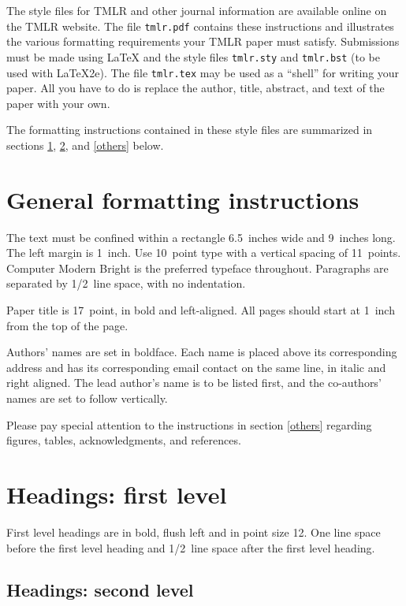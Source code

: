 \documentclass[10pt]{article} %
\begin{document}
The style files for TMLR and other journal information are available online on
the TMLR website.
The file \verb+tmlr.pdf+ contains these
instructions and illustrates the
various formatting requirements your TMLR paper must satisfy.
Submissions must be made using \LaTeX{} and the style files
\verb+tmlr.sty+ and \verb+tmlr.bst+ (to be used with \LaTeX{}2e). The file
\verb+tmlr.tex+ may be used as a ``shell'' for writing your paper. All you
have to do is replace the author, title, abstract, and text of the paper with
your own.

The formatting instructions contained in these style files are summarized in
sections \ref{gen_inst}, \ref{headings}, and \ref{others} below.

\section{General formatting instructions}
\label{gen_inst}

The text must be confined within a rectangle 6.5~inches wide and
9~inches long. The left margin is 1~inch.
Use 10~point type with a vertical spacing of 11~points. Computer Modern Bright is the
preferred typeface throughout. Paragraphs are separated by 1/2~line space,
with no indentation.

Paper title is 17~point, in bold and left-aligned.
All pages should start at 1~inch from the top of the page.

Authors' names are
set in boldface. Each name is placed above its corresponding
address and has its corresponding email contact on the same line, in italic 
and right aligned. The lead author's name is to be listed first, and
the co-authors' names are set to follow vertically.

Please pay special attention to the instructions in section \ref{others}
regarding figures, tables, acknowledgments, and references.

\section{Headings: first level}
\label{headings}

First level headings are in bold,
flush left and in point size 12. One line space before the first level
heading and 1/2~line space after the first level heading.

\subsection{Headings: second level}
\end{document}
